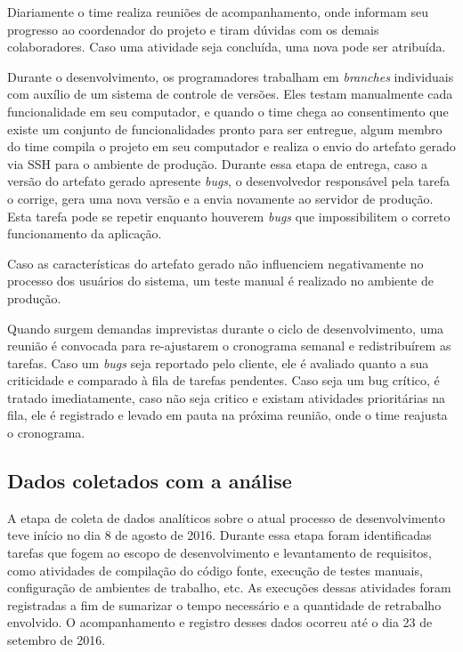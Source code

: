 \documentclass[
	12pt,				%
	openright,			%
	twoside,			%
	a4paper,			%
	english,			%
	french,				%
	spanish,			%
	brazil,				%
	]{abntex2}
\begin{document}
Diariamente o time realiza reuniões de acompanhamento, onde informam seu progresso ao coordenador do projeto e tiram dúvidas com os demais colaboradores. Caso uma atividade seja concluída, uma nova pode ser atribuída.

Durante o desenvolvimento, os programadores trabalham em \textit{branches} individuais com auxílio de um sistema de controle de versões. Eles testam manualmente cada funcionalidade em seu computador, e quando o time chega ao consentimento que existe um conjunto de funcionalidades pronto para ser entregue, algum membro do time compila o projeto em seu computador e realiza o envio do artefato gerado via SSH para o ambiente de produção. Durante essa etapa de entrega, caso a versão do artefato gerado apresente \textit{bugs}, o desenvolvedor responsável pela tarefa o corrige, gera uma nova versão e a envia novamente ao servidor de produção. Esta tarefa pode se repetir enquanto houverem \textit{bugs} que impossibilitem o correto funcionamento da aplicação.

Caso as características do artefato gerado não influenciem negativamente no processo dos usuários do sistema, um teste manual é realizado no ambiente de produção.

Quando surgem demandas imprevistas durante o ciclo de desenvolvimento, uma reunião é convocada para re-ajustarem o cronograma semanal e redistribuírem as tarefas. Caso um \textit{bugs} seja reportado pelo cliente, ele é avaliado quanto a sua criticidade e comparado à fila de tarefas pendentes. Caso seja um bug crítico, é tratado imediatamente, caso não seja critico e existam atividades prioritárias na fila, ele é registrado e levado em pauta na próxima reunião, onde o time reajusta o cronograma.

\subsection{Dados coletados com a análise}

A etapa de coleta de dados analíticos sobre o atual processo de desenvolvimento teve início no dia 8 de agosto de 2016. Durante essa etapa foram identificadas tarefas que fogem ao escopo de desenvolvimento e levantamento de requisitos, como atividades de compilação do código fonte, execução de testes manuais, configuração de ambientes de trabalho, etc. As execuções dessas atividades foram registradas a fim de sumarizar o tempo necessário e a quantidade de retrabalho envolvido. O acompanhamento e registro desses dados ocorreu até o dia 23 de setembro de 2016.
\end{document}
